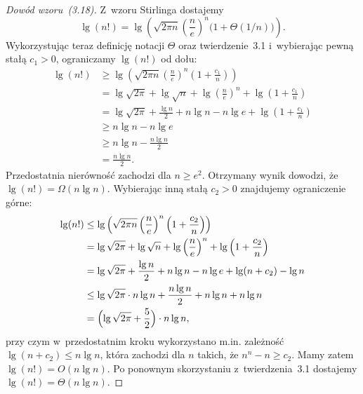 \exercise{} %
\begin{proof}[Dowód wzoru~(3.18)]
	Z~wzoru Stirlinga dostajemy
	\[
		\lg(n!) = \lg\left(\sqrt{2\pi n}\left(\frac{n}{e}\right)^n\bigl(1+\Theta(1/n)\bigr)\right).
	\]
	Wykorzystując teraz definicję notacji $\Theta$ oraz twierdzenie~3.1 i~wybierając pewną stałą $c_1>0$, ograniczamy $\lg(n!)$ od dołu:
	\begin{align*}
		\lg(n!) &\ge \lg\left(\sqrt{2\pi n}\left(\frac{n}{e}\right)^n\left(1+\frac{c_1}{n}\right)\right) \\
		&= \lg\sqrt{2\pi}+\lg\sqrt{n}+\lg\left(\frac{n}{e}\right)^n+\lg\left(1+\frac{c_1}{n}\right) \\
		&= \lg\sqrt{2\pi}+\frac{\lg n}{2}+n\lg n-n\lg e+\lg\left(1+\frac{c_1}{n}\right) \\
		&\ge n\lg n-n\lg e\\
		&\ge n\lg n-\frac{n\lg n}{2} \\
		&= \frac{n\lg n}{2}.
	\end{align*}
	Przedostatnia nierówność zachodzi dla $n\ge e^2$. Otrzymany wynik dowodzi, że $\lg(n!)=\Omega(n\lg n)$. Wybierając inną stałą $c_2>0$ znajdujemy ograniczenie górne:
	\begin{align*}
		\lg(n!) &\le \lg\left(\sqrt{2\pi n}\left(\frac{n}{e}\right)^n\left(1+\frac{c_2}{n}\right)\right) \\
		&= \lg\sqrt{2\pi}+\lg\sqrt{n}+\lg\left(\frac{n}{e}\right)^n+\lg\left(1+\frac{c_2}{n}\right) \\
		&= \lg\sqrt{2\pi}+\frac{\lg n}{2}+n\lg n-n\lg e+\lg(n+c_2)-\lg n\\
		&\le \lg\sqrt{2\pi}\cdot n\lg n+\frac{n\lg n}{2}+n\lg n+n\lg n\\
		&= \Bigl(\lg\sqrt{2\pi}+\frac{5}{2}\Bigr)\cdot n\lg n,
	\end{align*}
	przy czym w~przedostatnim kroku wykorzystano \hbox{m.in.} zależność $\lg(n+c_2)\le n\lg n$, która zachodzi dla $n$ takich, że $n^n-n\ge c_2$. Mamy zatem $\lg(n!)=O(n\lg n)$. Po ponownym skorzystaniu z~twierdzenia~3.1 dostajemy $\lg(n!)=\Theta(n\lg n)$.
\end{proof}

